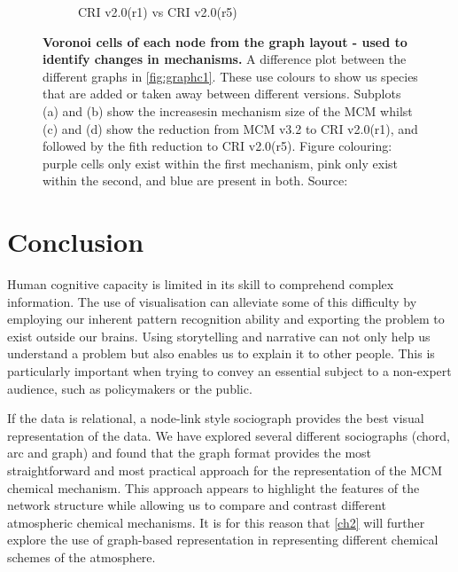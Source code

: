 \begin{figure}[H]
\begin{subfigure}[b]{.49\textwidth}
         \caption{CRI v2.0(r1) vs CRI v2.0(r5)}
         \label{fig:cr1tocr5}
     \end{subfigure}
      \hfill
        \caption{ \textbf{Voronoi cells of each node from the graph layout - used to identify changes in mechanisms.} A difference plot between the different graphs in \autoref{fig:graphc1}. These use colours to show us species that are added or taken away between different versions. Subplots (a) and (b) show the increasesin mechanism size of the MCM whilst (c) and (d) show the reduction from MCM v3.2 to CRI v2.0(r1), and followed by the fith reduction to CRI v2.0(r5).  
        Figure colouring: purple cells only exist within the first mechanism, pink only exist within the second, and blue are present in both.  Source: \cite{mcmblue}}
        \label{fig:mcmchange}
\end{figure}







%
%
\newpage


\section{Conclusion}

Human cognitive capacity is limited in its skill to comprehend complex information. The use of visualisation can alleviate some of this difficulty by employing our inherent pattern recognition ability and exporting the problem to exist outside our brains. Using storytelling and narrative can not only help us understand a problem but also enables us to explain it to other people. This is particularly important when trying to convey an essential subject to a non-expert audience, such as policymakers or the public.

If the data is relational, a node-link style sociograph provides the best visual representation of the data. We have explored several different sociographs (chord, arc and graph) and found that the graph format provides the most straightforward and most practical approach for the representation of the MCM chemical mechanism. This approach appears to highlight the features of the network structure while allowing us to compare and contrast different atmospheric chemical mechanisms. It is for this reason that \autoref{ch2} will further explore the use of graph-based representation in representing different chemical schemes of the atmosphere.
